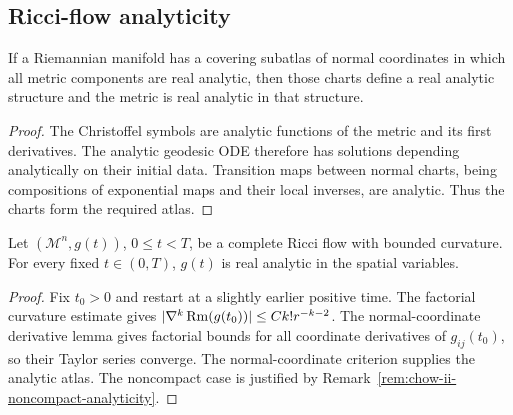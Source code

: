 \subsection{Ricci-flow analyticity}

\begin{lemma}
\label{lem:chow-ii-normal-coordinate-analytic-atlas}

If a Riemannian manifold has a covering subatlas of normal coordinates in
which all metric components are real analytic, then those charts define a
real analytic structure and the metric is real analytic in that structure.
\end{lemma}
\begin{proof}
\sketch
The Christoffel symbols are analytic functions of the metric and its first
derivatives.  The analytic geodesic ODE therefore has solutions depending
analytically on their initial data.  Transition maps between normal charts,
being compositions of exponential maps and their local inverses, are
analytic.  Thus the charts form the required atlas.
\end{proof}

\begin{theorem}
\label{thm:chow-ii-ricci-flow-spatial-real-analyticity}

Let \((\mathcal M^n,g(t))\), \(0\leq t<T\), be a complete Ricci flow with
bounded curvature.  For every fixed \(t\in(0,T)\), \(g(t)\) is real analytic
in the spatial variables.
\end{theorem}
\begin{proof}
\sketch
{}
Fix \(t_0>0\) and restart at a slightly earlier positive time.  The factorial
curvature estimate gives \(|\nabla^k\operatorname{Rm}(g(t_0))|\leq Ck!r^{-k-2}\).  The
normal-coordinate derivative lemma gives factorial bounds for all coordinate
derivatives of \(g_{ij}(t_0)\), so their Taylor series converge.  The
normal-coordinate criterion supplies the analytic atlas.  The noncompact
case is justified by Remark~\ref{rem:chow-ii-noncompact-analyticity}.
\end{proof}

